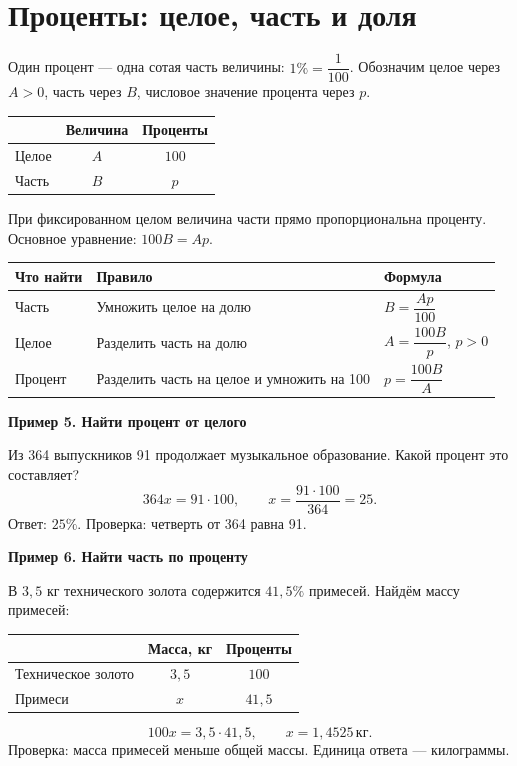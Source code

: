 \documentclass[a4paper,12pt]{article}
\newcommand{\ex}[1]{\par\smallskip\textcolor{darkaccent}{\textbf{#1}}\par}
\newcommand{\kg}{\,\text{кг}}
\begin{document}
\section{Проценты: целое, часть и доля}
Один процент — одна сотая часть величины: $1\%=\dfrac{1}{100}$. Обозначим целое через $A>0$, часть через $B$, числовое значение процента через $p$.
\begin{center}
\begin{tabular}{@{}lcc@{}}
\toprule & Величина & Проценты\\\midrule
Целое & $A$ & $100$\\
Часть & $B$ & $p$\\\bottomrule
\end{tabular}
\end{center}
При фиксированном целом величина части прямо пропорциональна проценту. Основное уравнение: $100B=Ap$.
\begin{center}
\begin{tabularx}{\linewidth}{@{}lXl@{}}
\toprule Что найти & Правило & Формула\\\midrule
Часть & Умножить целое на долю & $B=\dfrac{Ap}{100}$\\[2pt]
Целое & Разделить часть на долю & $A=\dfrac{100B}{p}$, $p>0$\\[2pt]
Процент & Разделить часть на целое и умножить на 100 & $p=\dfrac{100B}{A}$\\\bottomrule
\end{tabularx}
\end{center}
\ex{Пример 5. Найти процент от целого}
Из 364 выпускников 91 продолжает музыкальное образование. Какой процент это составляет?
\[364x=91\cdot100,\qquad x=\frac{91\cdot100}{364}=25.\]
Ответ: $25\%$. Проверка: четверть от 364 равна 91.
\ex{Пример 6. Найти часть по проценту}
В $3{,}5$ кг технического золота содержится $41{,}5\%$ примесей. Найдём массу примесей:
\begin{center}
\begin{tabular}{@{}lcc@{}}
\toprule & Масса, кг & Проценты\\\midrule
Техническое золото & $3{,}5$ & $100$\\
Примеси & $x$ & $41{,}5$\\\bottomrule
\end{tabular}
\end{center}
\[100x=3{,}5\cdot41{,}5,\qquad x=1{,}4525\kg.\]
Проверка: масса примесей меньше общей массы. Единица ответа — килограммы.
\clearpage
\end{document}
